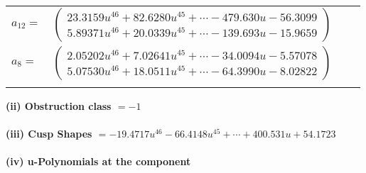 \documentclass[1p]{elsarticle_modified}
\theoremstyle{definition}
\begin{document}
\begin{tabular}{m{7pt} m{180pt} m{7pt} m{180pt} }
\flushright $a_{12}=$&$\begin{pmatrix}23.3159 u^{46}+82.6280 u^{45}+\cdots-479.630 u-56.3099\\5.89371 u^{46}+20.0339 u^{45}+\cdots-139.693 u-15.9659\end{pmatrix}$ \\
\flushright $a_{8}=$&$\begin{pmatrix}2.05202 u^{46}+7.02641 u^{45}+\cdots-34.0094 u-5.57078\\5.07530 u^{46}+18.0511 u^{45}+\cdots-64.3990 u-8.02822\end{pmatrix}$\\&\end{tabular}
\flushleft \textbf{(ii) Obstruction class $= -1$}\\~\\
\flushleft \textbf{(iii) Cusp Shapes $= -19.4717 u^{46}-66.4148 u^{45}+\cdots+400.531 u+54.1723$}\\~\\
\newpage\renewcommand{\arraystretch}{1}
\flushleft \textbf{(iv) u-Polynomials at the component}\newline \\
\end{document}
